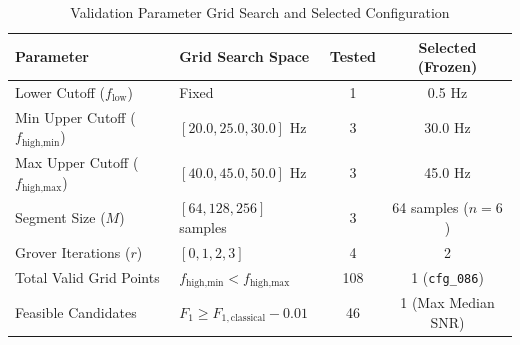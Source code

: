 \begin{table}[t]
\centering
\caption{Validation Parameter Grid Search and Selected Configuration}
\label{tab:validation_grid}
\begin{tabular}{lp{3.5cm}cc}
\hline
\textbf{Parameter} & \textbf{Grid Search Space} & \textbf{Tested} & \textbf{Selected (Frozen)} \\
\hline
Lower Cutoff ($f_{\text{low}}$) & Fixed & 1 & 0.5 Hz \\
Min Upper Cutoff ($f_{\text{high,min}}$) & $[20.0, 25.0, 30.0]$ Hz & 3 & 30.0 Hz \\
Max Upper Cutoff ($f_{\text{high,max}}$) & $[40.0, 45.0, 50.0]$ Hz & 3 & 45.0 Hz \\
Segment Size ($M$) & $[64, 128, 256]$ samples & 3 & 64 samples ($n=6$) \\
Grover Iterations ($r$) & $[0, 1, 2, 3]$ & 4 & 2 \\
Total Valid Grid Points & $f_{\text{high,min}} < f_{\text{high,max}}$ & 108 & 1 (\texttt{cfg\_086}) \\
Feasible Candidates & $F_1 \ge F_{1,\text{classical}} - 0.01$ & 46 & 1 (Max Median SNR) \\
\hline
\end{tabular}
\end{table}

